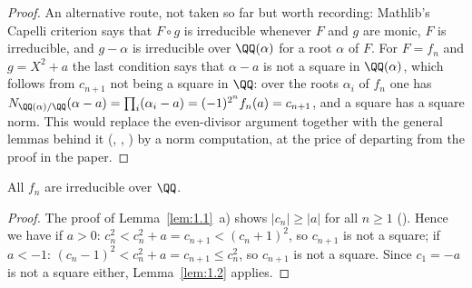 \begin{proof}
{  An alternative route, not taken so far but worth recording: Mathlib's Capelli criterion
   says that $F \circ g$ is irreducible whenever $F$ and $g$
  are monic, $F$ is irreducible, and $g - \alpha$ is irreducible over $\QQ(\alpha)$ for a root
  $\alpha$ of $F$. For $F = f_n$ and $g = X^2 + a$ the last condition says that $\alpha - a$ is
  not a square in $\QQ(\alpha)$, which follows from $c_{n+1}$ not being a square in $\QQ$: over
  the roots $\alpha_i$ of $f_n$ one has
  $N_{\QQ(\alpha)/\QQ}(\alpha - a) = \prod_i (\alpha_i - a) = (-1)^{2^n} f_n(a) = c_{n+1}$,
  and a square has a square norm. This would replace the even-divisor argument together with the
  general lemmas behind it (,
  ,
  ) by a norm
  computation, at the price of departing from the proof in the paper.}
\end{proof}

\begin{corollary}
  \label{cor:1.3}
  \leanok
  All $f_n$ are irreducible over $\QQ$.
\end{corollary}
\begin{proof}
  \leanok
  The proof of Lemma~\ref{lem:1.1}~a) shows $|c_n| \ge |a|$ for all $n \ge 1$
  (). Hence we have if
  $a > 0$: $c_n^2 < c_n^2 + a = c_{n+1} < (c_n + 1)^2$, so $c_{n+1}$ is not a square; if
  $a < -1$: $(c_n - 1)^2 < c_n^2 + a = c_{n+1} \le c_n^2$, so $c_{n+1}$ is not a square. Since
  $c_1 = -a$ is not a square either, Lemma~\ref{lem:1.2} applies.
\end{proof}

